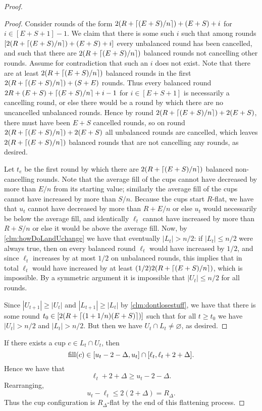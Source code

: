 \begin{proof}
\begin{proof}
  Consider rounds of the form $2(R + \left\lceil (E+S)/n \right\rceil) + (E+S) + i$
  for $i \in [E+S+1]-1$. We claim that there is some such $i$
  such that among rounds $[2(R + \left\lceil (E+S)/n \right\rceil) + (E+S) + i]$
  every unbalanced round has been cancelled, and such that there
  are $2(R+\left\lceil (E+S)/n \right\rceil)$ balanced rounds not cancelling other
  rounds. Assume for contradiction that such an $i$ does not
  exist. Note that there are at least $2(R + \left\lceil (E+S)/n \right\rceil)$
  balanced rounds in the first $2(R + \left\lceil (E+S)/n \right\rceil) + (S+E)$
  rounds. Thus every balanced round $2R+(E+S)+\left\lceil (E+S)/n \right\rceil +
  i-1$ for $i \in [E+S+1]$ is necessarily a cancelling round, or
  else there would be a round by which there are no uncancelled
  unbalanced rounds. Hence by round $2(R + \left\lceil (E+S)/n \right\rceil) + 2(E +
  S)$, there must have been $E+S$ cancelled rounds, so on round
  $2(R + \left\lceil (E+S)/n \right\rceil) + 2(E+S)$ all unbalanced rounds are
  cancelled, which leaves $2(R + \left\lceil (E+S)/n \right\rceil)$ balanced rounds
  that are not cancelling any rounds, as desired.

  Let $t_e$ be the first round by which there are $2(R +
  \left\lceil (E+S)/n \right\rceil)$ balanced non-cancelling rounds. Note that the
  average fill of the cups cannot have decreased by more than
  $E/n$ from its starting value; similarly the average fill of
  the cups cannot have increased by more than $S/n$. Because the
  cups start $R$-flat, we have that $u_t$ cannot have decreased
  by more than $R + E/n$ or else $u_t$ would necessarily be below
  the average fill, and identically $\ell_t$ cannot have
  increased by more than $R + S/n$ or else it would be above the
  average fill. Now, by \cref{clm:howDoLandUchange} we have that
  eventually $|L_t| > n/2$: if $|L_t|\le n/2$ were always true,
  then on every balanced round $\ell_t$ would have increased by
  $1/2$, and since $\ell_t$ increases by at most $1/2$ on
  unbalanced rounds, this implies that in total $\ell_t$ would
  have increased by at least $(1/2)2(R + \left\lceil (E+S)/n \right\rceil)$, which
  is impossible. By a symmetric argument it is impossible that
  $|U_t| \le n/2$ for all rounds. 

  Since $|U_{t+1}|\ge |U_t|$ and $|L_{t+1}| \ge |L_t|$ by
  \cref{clm:dontlosestuff}, we have that there is some round $t_0
  \in [2(R + \left\lceil (1+1/n)(E+S) \right\rceil)]$ such that for all $t \ge t_0$
  we have $|U_t|> n/2$ and $|L_t|> n/2$. But then we
  have $U_t\cap L_t \neq \varnothing$, as desired.
  \end{proof}

  If there exists a cup $c \in L_t\cap U_t$, then 
  $$\operatorname{\text{\textup{fill}}}(c) \in [u_t-2-\Delta, u_t] \cap [\ell_t, \ell_t + 2 +
  \Delta].$$ Hence we have that $$\ell_t+2+\Delta \ge
  u_t-2-\Delta.$$ Rearranging, $$u_t - \ell_t \le 2(2+\Delta) =
  R_\Delta.$$ Thus the cup configuration is $R_\Delta$-flat by
  the end of this flattening process.

\end{proof}

